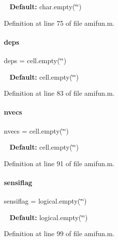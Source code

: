 ~\newline
{\bfseries Default\+:} char.\+empty(\char`\"{}\char`\"{}) 

Definition at line 75 of file amifun.\+m.

\mbox{\label{classamifun_a69ffe5c24686ceb79ed44399e6be556c}} 
\paragraph{\texorpdfstring{deps}{deps}}
{\footnotesize\ttfamily deps = cell.\+empty(\char`\"{}\char`\"{})}

~\newline
{\bfseries Default\+:} cell.\+empty(\char`\"{}\char`\"{}) 

Definition at line 83 of file amifun.\+m.

\mbox{\label{classamifun_a019d960f3d1c1c819a7f3fc90f952c4b}} 
\paragraph{\texorpdfstring{nvecs}{nvecs}}
{\footnotesize\ttfamily nvecs = cell.\+empty(\char`\"{}\char`\"{})}

~\newline
{\bfseries Default\+:} cell.\+empty(\char`\"{}\char`\"{}) 

Definition at line 91 of file amifun.\+m.

\mbox{\label{classamifun_ad8930a02bca1d5facc6203b722d5349d}} 
\paragraph{\texorpdfstring{sensiflag}{sensiflag}}
{\footnotesize\ttfamily sensiflag = logical.\+empty(\char`\"{}\char`\"{})}

~\newline
{\bfseries Default\+:} logical.\+empty(\char`\"{}\char`\"{}) 

Definition at line 99 of file amifun.\+m.

